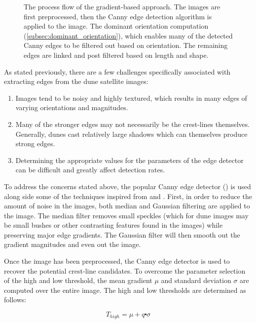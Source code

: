  \begin{figure}[H]
 	\centering
 	\caption{The process flow of the gradient-based approach. The images are first preprocessed, then the Canny edge detection algorithm is applied to the image. The dominant orientation computation (\ref{subsec:dominant_orientation}), which enables many of the detected Canny edges to be filtered out based on orientation. The remaining edges are linked and post filtered based on length and shape.}
 	\label{fig:flow_gradient_based}
 \end{figure}

As stated previously, there are a few challenges specifically associated with extracting edges from the dune satellite images:

\begin{enumerate}
	\item Images tend to be noisy and highly textured, which results in many edges of varying orientations and magnitudes.
	\item Many of the stronger edges may not necessarily be the crest-lines themselves. Generally, dunes cast relatively large shadows which can themselves produce strong edges.
	\item Determining the appropriate values for the parameters of the edge detector can be difficult and greatly affect detection rates.
\end{enumerate}

To address the concerns stated above, the popular Canny edge detector (\cite{1986_canny_edge_detection}) is used along side some of the techniques inspired from \cite{Improved_Canny_Edge_Detection} and \cite{Runway_detection_tracking_unmanned}. First, in order to reduce the amount of noise in the images, both median and Gaussian filtering are applied to the image. The median filter removes small speckles (which for dune images may be small bushes or other contrasting features found in the images) while preserving major edge gradients. The Gaussian filter will then smooth out the gradient magnitudes and even out the image.

Once the image has been preprocessed, the Canny edge detector is used to recover the potential crest-line candidates. To overcome the parameter selection of the high and low threshold, the mean gradient $\mu$ and standard deviation $\sigma$ are computed over the entire image. The high and low thresholds are determined as follows:

\begin{equation}
T_{high}=\mu+q\centerdot\sigma
\end{equation}


